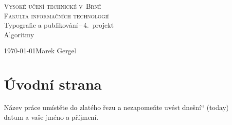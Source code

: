 \documentclass[a4paper, 11pt]{article}
\providecommand{\uv}[1]{\quotedblbase#1\textquotedblleft}
\begin{document}
\thispagestyle{empty}
\begin{titlepage}
    \begin{center}
        \textsc{\Huge Vysoké učení technické v~Brně\\ \medskip
        \huge Fakulta informačních technologií}\\ \bigskip
        {\LARGE Typografie a publikování\,--\,4.\ projekt\medskip \\} 
        {\Huge Algoritmy}
    \end{center}
    {\Large \today \hfill Marek Gergel \\}
\end{titlepage}

\section{Úvodní strana}
Název práce umístěte do zlatého řezu a nezapomeňte uvést \uv{dnešní} (today) datum a vaše jméno a příjmení.
\end{document}
